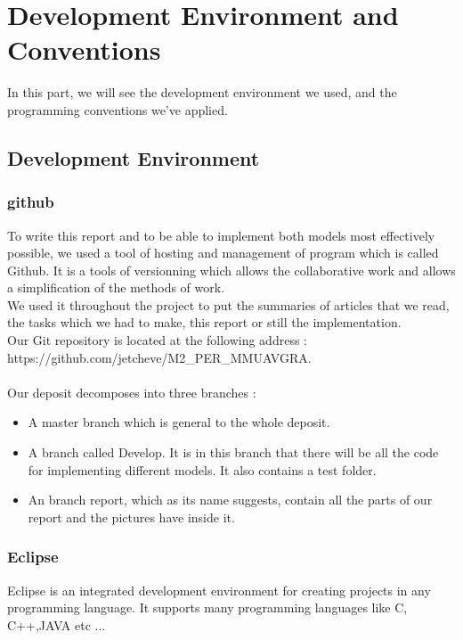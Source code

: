 \chapter{Development Environment and Conventions}

In this part, we will see the development environment we used, and the programming conventions we've applied.

\section{Development Environment}

\subsection{github}

To write this report and to be able to implement both models most effectively possible, we used a tool of hosting and management of program which is called Github. It is a tools of versionning which allows the collaborative work and allows a simplification of the methods of work.\\
We used it throughout the project to put the summaries of articles that we read, the tasks which we had to make, this report or still the implementation.\\
Our Git repository is located at the following address :
https://github.com/jetcheve/M2\_PER\_MMUAVGRA.\\\\

Our deposit decomposes into three branches :

\begin{itemize}
\item A master branch which is general to the whole deposit.
\item A branch called Develop. It is in this branch that there will be all the code for implementing different models. It also contains a test folder. 
\item An branch report, which as its name suggests, contain all the parts of our report and the pictures have inside it.
\end{itemize}

\subsection{Eclipse}

Eclipse is an integrated development environment for creating projects in any programming language. It supports many programming languages ​​like C, C++,JAVA etc ...\\\\

